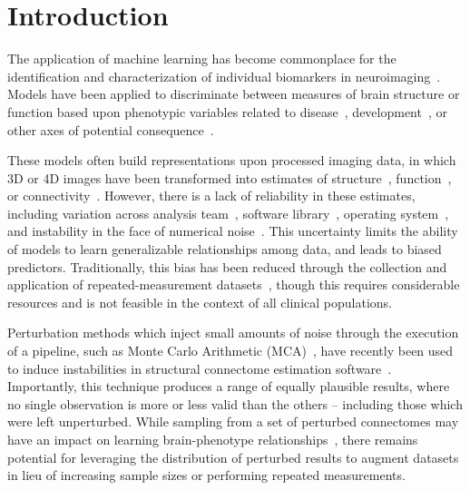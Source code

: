 \documentclass[10pt]{SelfArx} %
\affiliation{\textsuperscript{1}\textit{Montréal Neurological Institute, McGill University, Montréal, QC, Canada}}
\affiliation{\textsuperscript{2}\textit{Department of Computer Science and Software Engineering, Concordia University, Montréal, QC, Canada}}
\begin{document}
\flushbottom %
\maketitle %
\thispagestyle{empty} %

\pagestyle{fancy}
\section*{Introduction}

The application of machine learning has become commonplace for the identification and characterization of individual
biomarkers in neuroimaging~\cite{woo2017building}. Models have been applied to discriminate between measures of brain
structure or function based upon phenotypic variables related to
disease~\cite{Crossley2014-tg,Payabvash2019-tm,Tolan2018-nq}, development~\cite{Zhang2019-ko}, or other axes of
potential consequence~\cite{Zhu2018-cs,Park2015-uj}.

These models often build representations upon processed imaging data, in which 3D or 4D images have been transformed
into estimates of structure~\cite{wade2017machine}, function~\cite{weis2020sex}, or
connectivity~\cite{munsell2015evaluation}. However, there is a lack of reliability in these estimates, including
variation across analysis team~\cite{botvinik2020variability}, software library~\cite{bowring2019exploring}, operating
system~\cite{salari2020file}, and instability in the face of numerical noise~\cite{Kiar2020-kz}. This uncertainty
limits the ability of models to learn generalizable relationships among data, and leads to biased predictors.
Traditionally, this bias has been reduced through the collection and application of repeated-measurement
datasets~\cite{sudlow2015uk,zuo2014open}, though this requires considerable resources and is not feasible in the
context of all clinical populations.

Perturbation methods which inject small amounts of noise through the execution of a pipeline, such as Monte Carlo
Arithmetic (MCA)~\cite{Parker1997-qq,Denis2016-wo}, have recently been used to induce instabilities in structural
connectome estimation software~\cite{Kiar2020-lb}. Importantly, this technique produces a range of equally plausible
results, where no single observation is more or less valid than the others – including those which were left
unperturbed. While sampling from a set of perturbed connectomes may have an impact on learning brain-phenotype
relationships~\cite{Kiar2020-kz}, there remains potential for leveraging the distribution of perturbed results to
augment datasets in lieu of increasing sample sizes or performing repeated measurements.
\end{document}
